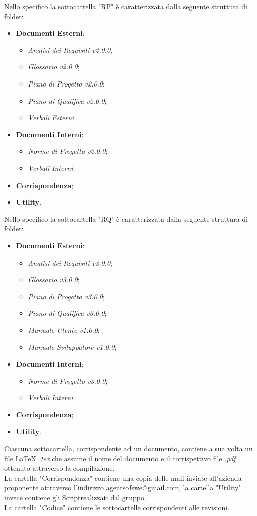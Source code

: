 	Nello specifico la sottocartella "RP" è caratterizzata dalla seguente struttura di folder:
	\begin{itemize}
	\item \textbf{Documenti Esterni}:
		\begin{itemize}
		\item \textit{Analisi dei Requisiti v2.0.0};
		\item \textit{Glossario v2.0.0};
		\item \textit{Piano di Progetto v2.0.0};
		\item \textit{Piano di Qualifica v2.0.0};
		\item \textit{Verbali Esterni}.
		\end{itemize}
	\item \textbf{Documenti Interni}:
		\begin{itemize}
		\item \textit{Norme di Progetto v2.0.0};
		\item \textit{Verbali Interni}.
		\end{itemize}
	\item \textbf{Corrispondenza};
	\item \textbf{Utility}.
	\end{itemize}
	Nello specifico la sottocartella "RQ" è caratterizzata dalla seguente struttura di folder:
	\begin{itemize}
		\item \textbf{Documenti Esterni}:
		\begin{itemize}
			\item \textit{Analisi dei Requisiti v3.0.0};
			\item \textit{Glossario v3.0.0};
			\item \textit{Piano di Progetto v3.0.0};
			\item \textit{Piano di Qualifica v3.0.0};
			\item \textit{Manuale Utente v1.0.0};
			\item \textit{Manuale Sviluppatore v1.0.0};
		\end{itemize}
		\item \textbf{Documenti Interni}:
		\begin{itemize}
			\item \textit{Norme di Progetto v3.0.0};
			\item \textit{Verbali Interni}.
		\end{itemize}
		\item \textbf{Corrispondenza};
		\item \textbf{Utility}.
	\end{itemize}
	Ciascuna sottocartella, corrispondente ad un documento, contiene a sua volta un file LaTeX \textit{.tex} che assume il nome del documento e il corrispettivo file \textit{.pdf} ottenuto attraverso la compilazione.\\
	La cartella "Corrispondenza" contiene una copia delle mail inviate all'azienda proponente attraverso l'indirizzo agentsofswe@gmail.com, la cartella "Utility" invece contiene gli Script\glossario realizzati dal gruppo.\\
	La cartella "Codice" contiene le sottocartelle corrispondenti alle revisioni.

